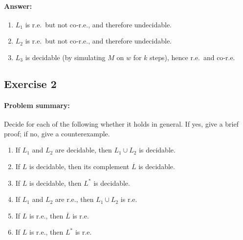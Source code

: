 \documentclass{article}
\begin{document}
        \paragraph{Answer:}
        \begin{enumerate}
          \item \(L_1\) is r.e.\ but not co‑r.e., and therefore undecidable.
          \item \(L_2\) is r.e.\ but not co‑r.e., and therefore undecidable.
          \item \(L_3\) is decidable (by simulating \(M\) on \(w\) for \(k\) steps), hence r.e.\ and co‑r.e.
        \end{enumerate}
        
        
        \subsection*{Exercise 2}
        \paragraph{Problem summary:}  
        Decide for each of the following whether it holds in general.  If yes, give a brief proof; if no, give a counterexample.
        \begin{enumerate}
          \item If \(L_1\) and \(L_2\) are decidable, then \(L_1\cup L_2\) is decidable.
          \item If \(L\) is decidable, then its complement \(\overline L\) is decidable.
  \item If \(L\) is decidable, then \(L^*\) is decidable.
  \item If \(L_1\) and \(L_2\) are r.e., then \(L_1\cup L_2\) is r.e.
  \item If \(L\) is r.e., then \(\overline L\) is r.e.
  \item If \(L\) is r.e., then \(L^*\) is r.e.
\end{enumerate}
\end{document}
